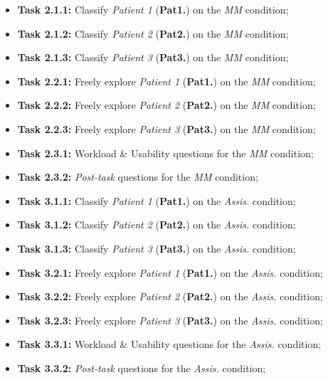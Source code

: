 \hfill

\begin{itemize}
\item[] \textbf{Task 2.1.1:} Classify \textit{Patient 1} ({\bf Pat1.}) on the \textit{MM} condition;
\item[] \textbf{Task 2.1.2:} Classify \textit{Patient 2} ({\bf Pat2.}) on the \textit{MM} condition;
\item[] \textbf{Task 2.1.3:} Classify \textit{Patient 3} ({\bf Pat3.}) on the \textit{MM} condition;
\end{itemize}

\hfill

\begin{itemize}
\item[] \textbf{Task 2.2.1:} Freely explore \textit{Patient 1} ({\bf Pat1.}) on the \textit{MM} condition;
\item[] \textbf{Task 2.2.2:} Freely explore \textit{Patient 2} ({\bf Pat2.}) on the \textit{MM} condition;
\item[] \textbf{Task 2.2.3:} Freely explore \textit{Patient 3} ({\bf Pat3.}) on the \textit{MM} condition;
\end{itemize}

\hfill

\begin{itemize}
\item[] \textbf{Task 2.3.1:} Workload \& Usability questions for the \textit{MM} condition;
\item[] \textbf{Task 2.3.2:} {\it Post-task} questions for the \textit{MM} condition;
\end{itemize}

\hfill

\begin{itemize}
\item[] \textbf{Task 3.1.1:} Classify \textit{Patient 1} ({\bf Pat1.}) on the \textit{Assis.} condition;
\item[] \textbf{Task 3.1.2:} Classify \textit{Patient 2} ({\bf Pat2.}) on the \textit{Assis.} condition;
\item[] \textbf{Task 3.1.3:} Classify \textit{Patient 3} ({\bf Pat3.}) on the \textit{Assis.} condition;
\end{itemize}

\hfill

\begin{itemize}
\item[] \textbf{Task 3.2.1:} Freely explore \textit{Patient 1} ({\bf Pat1.}) on the \textit{Assis.} condition;
\item[] \textbf{Task 3.2.2:} Freely explore \textit{Patient 2} ({\bf Pat2.}) on the \textit{Assis.} condition;
\item[] \textbf{Task 3.2.3:} Freely explore \textit{Patient 3} ({\bf Pat3.}) on the \textit{Assis.} condition;
\end{itemize}

\hfill

\begin{itemize}
\item[] \textbf{Task 3.3.1:} Workload \& Usability questions for the \textit{Assis.} condition;
\item[] \textbf{Task 3.3.2:} {\it Post-task} questions for the \textit{Assis.} condition;
\end{itemize}

\hfill

